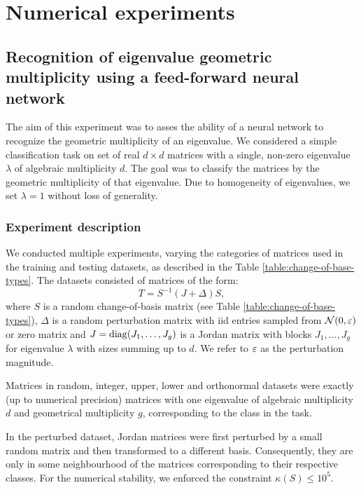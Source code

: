 

\chapter{Numerical experiments}
\section{Recognition of eigenvalue geometric multiplicity using a feed-forward neural network}

The aim of this experiment was to asses the ability of a neural network to recognize the geometric multiplicity of an eigenvalue. We considered a simple classification task on set of real $d\times d$ matrices with a single, non-zero eigenvalue $\lambda$ of algebraic multiplicity $d$. The goal was to classify the matrices by the geometric multiplicity of that eigenvalue. Due to homogeneity of eigenvalues, we set $\lambda = 1$ without loss of generality.

\subsection*{Experiment description}

We conducted multiple experiments, varying the categories of matrices used in the training and testing datasets, as described in the Table \ref{table:change-of-base-types}. The datasets consisted of matrices of the form:
\begin{equation}\label{eq:T_form}
    T = S^{-1}(J+\Delta)S,
\end{equation}
where $S$ is a random change-of-basis matrix (see Table \ref{table:change-of-base-types}), $\Delta$ is a random perturbation matrix with iid entries sampled from $\mathcal{N}(0, \varepsilon)$ or zero matrix  and $J = \mathrm{diag}(J_1, \dots, J_g)$ is a Jordan matrix with blocks $J_1, \dots, J_g$ for eigenvalue $\lambda$ with sizes summing up to $d$. We refer to $\varepsilon$ as the perturbation magnitude.

Matrices in random, integer, upper, lower and orthonormal datasets were exactly (up to numerical precision) matrices with one eigenvalue of algebraic multiplicity $d$ and geometrical multiplicity $g$, corresponding to the class in the task. 

In the perturbed dataset, Jordan matrices were first perturbed by a small random matrix and then transformed to a different basis. Consequently, they are only in some neighbourhood of the matrices corresponding to their respective classes. For the numerical stability, we enforced the constraint $\kappa(S) \leqslant 10^5$.

